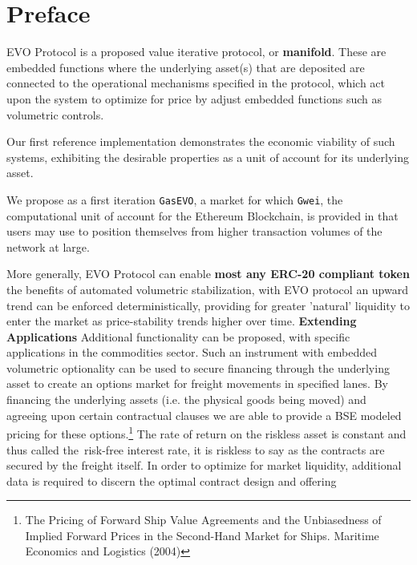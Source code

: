 

\chapter*{Preface}

EVO Protocol is a proposed value iterative protocol, or \textbf{manifold}.
These are embedded functions where the underlying asset(s) that are deposited are connected to the operational mechanisms specified in the protocol, which act upon the system to optimize for price by adjust embedded functions such as volumetric controls.\\
    \vspace{2mm}
    
Our first reference implementation demonstrates the economic viability of such systems, exhibiting the desirable properties as a unit of account for its underlying asset.

We propose as a first iteration \texttt{GasEVO}, a market for  which \texttt{Gwei}, the computational unit of account for the Ethereum Blockchain, is provided in that users may use to position themselves from higher transaction volumes of the network at large.
  \vspace{2mm}
  
More generally, EVO Protocol can enable \textbf{most any ERC-20 compliant token} the benefits of automated volumetric stabilization, with EVO protocol an upward trend can be enforced deterministically, providing for greater 'natural' liquidity to enter the market as price-stability trends higher over time. 
\textbf{Extending Applications}
Additional functionality can be proposed, with specific applications in the commodities sector. Such an instrument with embedded volumetric optionality can be used to secure financing through the underlying asset to create an options market for freight movements in specified lanes. By financing the underlying assets (i.e. the physical goods being moved) and agreeing upon certain contractual clauses we are able to provide a BSE modeled pricing for these options.\footnote{The Pricing of Forward Ship Value Agreements and the Unbiasedness of Implied Forward Prices in the Second-Hand Market for Ships. Maritime Economics and Logistics (2004)}
    \vspace{2mm}
The rate of return on the riskless asset is constant and thus called the risk-free interest rate, it is riskless to say as the contracts are secured by the freight itself. In order to optimize for market liquidity, additional data is required to discern the optimal contract design and offering

